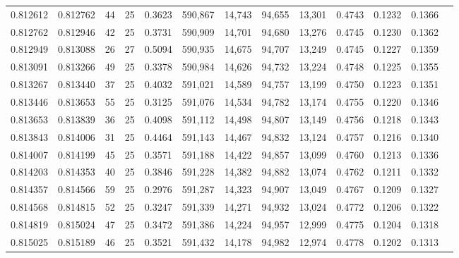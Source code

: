 \begin{tabular}{rrrrrrrrrrrrr}
0.812612 & 0.812762 &    44 &  25 &                                     0.3623 & 590,867 &  14,743 &  94,655 &  13,301 & 0.4743 & 0.1232 & 0.1366 \\
0.812762 & 0.812946 &    42 &  25 &                                     0.3731 & 590,909 &  14,701 &  94,680 &  13,276 & 0.4745 & 0.1230 & 0.1362 \\
0.812949 & 0.813088 &    26 &  27 &                                     0.5094 & 590,935 &  14,675 &  94,707 &  13,249 & 0.4745 & 0.1227 & 0.1359 \\
0.813091 & 0.813266 &    49 &  25 &                                     0.3378 & 590,984 &  14,626 &  94,732 &  13,224 & 0.4748 & 0.1225 & 0.1355 \\
0.813267 & 0.813440 &    37 &  25 &                                     0.4032 & 591,021 &  14,589 &  94,757 &  13,199 & 0.4750 & 0.1223 & 0.1351 \\
0.813446 & 0.813653 &    55 &  25 &                                     0.3125 & 591,076 &  14,534 &  94,782 &  13,174 & 0.4755 & 0.1220 & 0.1346 \\
0.813653 & 0.813839 &    36 &  25 &                                     0.4098 & 591,112 &  14,498 &  94,807 &  13,149 & 0.4756 & 0.1218 & 0.1343 \\
0.813843 & 0.814006 &    31 &  25 &                                     0.4464 & 591,143 &  14,467 &  94,832 &  13,124 & 0.4757 & 0.1216 & 0.1340 \\
0.814007 & 0.814199 &    45 &  25 &                                     0.3571 & 591,188 &  14,422 &  94,857 &  13,099 & 0.4760 & 0.1213 & 0.1336 \\
0.814203 & 0.814353 &    40 &  25 &                                     0.3846 & 591,228 &  14,382 &  94,882 &  13,074 & 0.4762 & 0.1211 & 0.1332 \\
0.814357 & 0.814566 &    59 &  25 &                                     0.2976 & 591,287 &  14,323 &  94,907 &  13,049 & 0.4767 & 0.1209 & 0.1327 \\
0.814568 & 0.814815 &    52 &  25 &                                     0.3247 & 591,339 &  14,271 &  94,932 &  13,024 & 0.4772 & 0.1206 & 0.1322 \\
0.814819 & 0.815024 &    47 &  25 &                                     0.3472 & 591,386 &  14,224 &  94,957 &  12,999 & 0.4775 & 0.1204 & 0.1318 \\
0.815025 & 0.815189 &    46 &  25 &                                     0.3521 & 591,432 &  14,178 &  94,982 &  12,974 & 0.4778 & 0.1202 & 0.1313 \\

\end{tabular}
